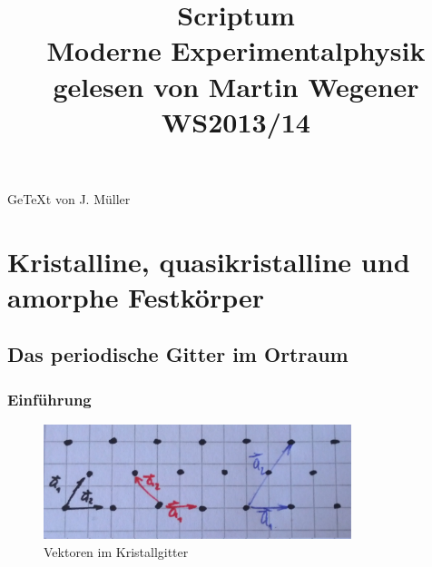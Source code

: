 \documentclass[paper=A4,12pt,pagesize,twoside,BCOR=10mm,ngerman]{scrartcl}
\title{\textnormal{Scriptum}\\ Moderne Experimentalphysik \uppercase\expandafter{\romannumeral2\relax}\\\textnormal{\large{gelesen von Martin Wegener WS2013/14}}}
\author{}
\date{}
\begin{document}
\maketitle
\vfill
\centering
\large{Ge\TeX t von J. Müller}
\setcounter{page}{0} 
\thispagestyle{empty}
\newpage
\tableofcontents
\newpage

\section{Kristalline, quasikristalline und amorphe Festkörper}
	\subsection{Das periodische Gitter im Ortraum}
		\subsubsection{Einführung}
			\begin{figure}[ht]
				\centering
				\includegraphics[width=0.8\textwidth]{pics/pic001.jpg}
				\caption{Vektoren im Kristallgitter}
				\end{figure}

			
\end{document}
